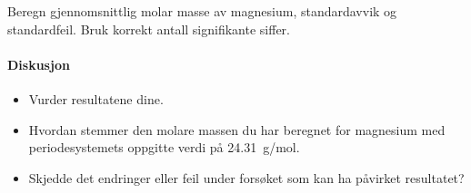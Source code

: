 	Beregn gjennomsnittlig molar masse av magnesium, standardavvik og standardfeil. Bruk korrekt antall signifikante siffer.
	
	\paragraph{Diskusjon}
	\begin{itemize}
		\item Vurder resultatene dine.
		\item Hvordan stemmer den molare massen du har beregnet for magnesium med periodesystemets oppgitte verdi på \SI{24.31}{g/mol}.
		\item Skjedde det endringer eller feil under forsøket som kan ha påvirket resultatet?
	\end{itemize}

